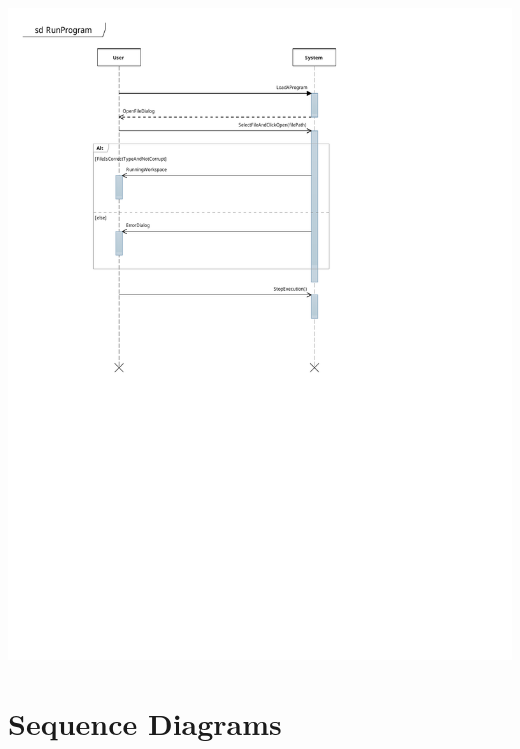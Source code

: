 \documentclass[12pt]{article}
\begin{document}
\begin{center}
        \includegraphics[scale=1]{./pdfs/MS4Models/LoadProgram.pdf}
\end{center}

\section{Sequence Diagrams}
\end{document}
